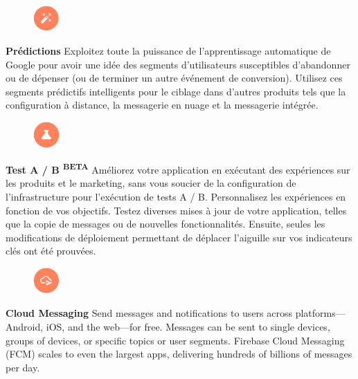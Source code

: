 \begin{figure}
	\includegraphics[width=1cm]{Images/chapter2/firebase_services/predictions.png}
\end{figure}
\textbf{Prédictions} Exploitez toute la puissance de l’apprentissage automatique de Google pour avoir une idée des segments d’utilisateurs susceptibles d’abandonner ou de dépenser (ou de terminer un autre événement de conversion). Utilisez ces segments prédictifs intelligents pour le ciblage dans d'autres produits tels que la configuration à distance, la messagerie en nuage et la messagerie intégrée.\medskip

\begin{figure}
	\includegraphics[width=1cm]{Images/chapter2/firebase_services/a_b_testing.png}
\end{figure}
\textbf{Test A / B \textsuperscript{BETA}} Améliorez votre application en exécutant des expériences sur les produits et le marketing, sans vous soucier de la configuration de l'infrastructure pour l'exécution de tests A / B. Personnalisez les expériences en fonction de vos objectifs. Testez diverses mises à jour de votre application, telles que la copie de messages ou de nouvelles fonctionnalités. Ensuite, seules les modifications de déploiement permettant de déplacer l'aiguille sur vos indicateurs clés ont été prouvées.\medskip

\begin{figure}
	\includegraphics[width=1cm]{Images/chapter2/firebase_services/cloud_messaging.png}
\end{figure}
\textbf{Cloud Messaging} Send messages and notifications to users across platforms—Android, iOS, and the web—for free. Messages can be sent to single devices, groups of devices, or specific topics or user segments. Firebase Cloud Messaging (FCM) scales to even the largest apps, delivering hundreds of billions of messages per day.\medskip

